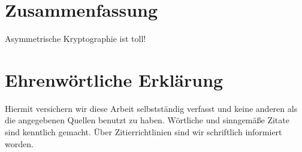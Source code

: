 \documentclass[a4paper, fontsize=12pt, parskip=full, toc=bibliographynumbered]{scrreprt}
\begin{document}





\author{}
\chapter{Zusammenfassung}

Asymmetrische Kryptographie ist toll!

\author{}
\chapter{Ehrenwörtliche Erklärung}

Hiermit versichern wir diese Arbeit selbstständig verfasst und keine
anderen als die angegebenen Quellen benutzt zu haben.  Wörtliche und
sinngemäße Zitate sind kenntlich gemacht.  Über Zitierrichtlinien
sind wir schriftlich informiert worden.
\end{document}
